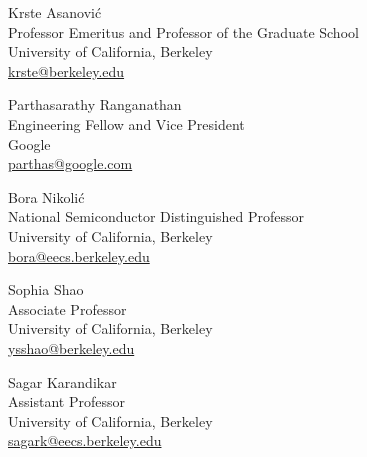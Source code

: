 \documentclass[line]{res}
\begin{document}
\begin{resume}
{\large{Krste Asanovi\'c}}
\\
Professor Emeritus and Professor of the Graduate School
\\
University of California, Berkeley
\\
\href{mailto:krste@berkeley.edu}{krste@berkeley.edu}

{\large{Parthasarathy Ranganathan}}
\\
Engineering Fellow and Vice President
\\
Google
\\
\href{mailto:parthas@google.com}{parthas@google.com}

{\large{Bora Nikoli\'c}}
\\
National Semiconductor Distinguished Professor
\\
University of California, Berkeley
\\
\href{mailto:bora@eecs.berkeley.edu}{bora@eecs.berkeley.edu}

{\large{Sophia Shao}}
\\
Associate Professor
\\
University of California, Berkeley
\\
\href{mailto:ysshao@berkeley.edu}{ysshao@berkeley.edu}

{\large{Sagar Karandikar}}
\\
Assistant Professor
\\
University of California, Berkeley
\\
\href{mailto:sagark@eecs.berkeley.edu}{sagark@eecs.berkeley.edu}

\end{resume}
\end{document}
